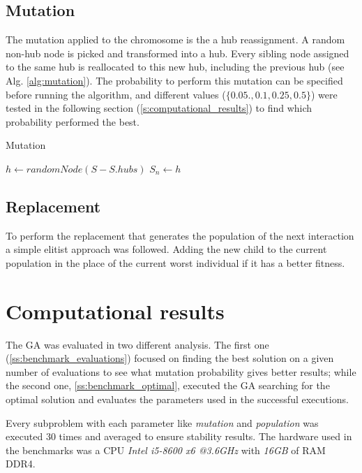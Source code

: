\documentclass[onecolumn]{IEEEtran}
\begin{document}
\subsection{Mutation\label{ss:mutation}}

The mutation applied to the chromosome is the a hub reassignment. A random non-hub node is
picked and transformed into a hub. Every sibling node assigned to the same hub is reallocated
to this new hub, including the previous hub (see Alg. \ref{alg:mutation}).
The probability to perform this mutation can be specified before running the algorithm,
and different values ($\{0.05., 0.1, 0.25, 0.5\}$) were tested in the following section 
(\ref{s:computational_results})
to find which probability performed the best.

\begin{algorithm}[H]
  \caption{Mutation}
  \label{alg:mutation}
  \begin{algorithmic}[1]
    \State $h \gets randomNode(S - S.hubs)$
        \State $S_{n} \gets h$
      \EndIf
    \EndFor
  \end{algorithmic}
\end{algorithm}

\subsection{Replacement}

To perform the replacement that generates the population of the next interaction a simple
elitist approach was followed. Adding the new child to the current population in the place
of the current worst individual if it has a better fitness.

\section{Computational results\label{s:computational_results}}

The GA was evaluated in two different analysis. The first one (\ref{ss:benchmark_evaluations}) 
focused on finding the best solution on a given number of evaluations to see what mutation probability
gives better results; while the second one, \ref{ss:benchmark_optimal},
executed the GA searching for the optimal solution and evaluates the parameters used in the successful
executions.

Every subproblem with each parameter like \emph{mutation} and \emph{population} was executed 30 times
and averaged to ensure stability results. The hardware used in the benchmarks was a CPU 
\emph{Intel i5-8600 x6 @3.6GHz} with \emph{16GB} of RAM DDR4.
\end{document}
